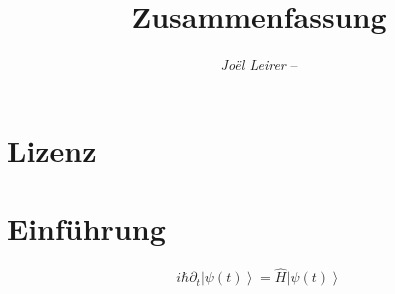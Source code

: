 \documentclass[margin=normal]{tex/hsrzf}
\author{\textsl{Joël Leirer} -- \texttt{\theauthoremail}}
\title{\texttt{\themodule} Zusammenfassung}
\date{\thesemester}
\begin{document}

\maketitle



\section*{Lizenz}
\doclicenseThis

\tableofcontents

\clearpage
\setcounter{page}{1}

\section{Einf\"uhrung}
\[
  i\hbar \partial_t \left| \psi(t) \right\rangle 
    = \hat{H} \left| \psi(t) \right\rangle
\]
\end{document}
